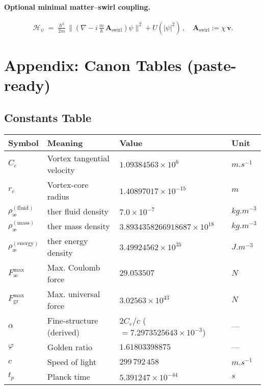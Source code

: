 \documentclass[11pt,a4paper]{article}
\newcommand{\aeether}{\text{\ae}} %
\begin{document}
    \paragraph{Optional minimal matter--swirl coupling.}
    \[
        \boxed{\, \mathcal H_\psi \;=\; \tfrac{\hbar^2}{2m}\,\big\lVert(\nabla - i\,\tfrac{m}{\hbar}\,\bm A_{\mathrm{swirl}})\psi\big\rVert^2 + U(|\psi|^2) \,},\quad \bm A_{\mathrm{swirl}}:=\chi\,\bm v.
    \]

    \section{Appendix: Canon Tables (paste-ready)}
    \subsection{Constants Table}
    \begin{center}
        \begin{tabular}{@{}llll@{}}
            \toprule
            \textbf{Symbol} & \textbf{Meaning} & \textbf{Value} & \textbf{Unit} \\
            \midrule
            $C_e$ & Vortex tangential velocity & $1.09384563\times 10^{6}$ & $\si{m.s^{-1}}$ \\
            $r_c$ & Vortex-core radius & $1.40897017\times 10^{-15}$ & $\si{m}$ \\
            $\rho_{\aeether}^{(\mathrm{fluid})}$  & \aeether{}ther fluid density & $7.0\times 10^{-7}$ & $\si{kg.m^{-3}}$ \\
            $\rho_{\aeether}^{(\mathrm{mass})}$   & \aeether{}ther mass density & $3.8934358266918687\times 10^{18}$ & $\si{kg.m^{-3}}$ \\
            $\rho_{\aeether}^{(\mathrm{energy})}$ & \aeether{}ther energy density & $3.49924562\times 10^{35}$ & $\si{J.m^{-3}}$ \\
            $F_{\aeether}^{\max}$ & Max. Coulomb force & $29.053507$ & $\si{N}$ \\
            $F_{\mathrm{gr}}^{\max}$ & Max. universal force & $3.02563\times 10^{43}$ & $\si{N}$ \\
            $\alpha$ & Fine-structure (derived) & $2C_e/c$ ($=7.2973525643\times 10^{-3}$) & --- \\
            $\varphi$ & Golden ratio & $1.61803398875$ & --- \\
            $c$ & Speed of light & $299\,792\,458$ & $\si{m.s^{-1}}$ \\
            $t_p$ & Planck time & $5.391247\times 10^{-44}$ & $\si{s}$ \\
            \bottomrule
        \end{tabular}
    \end{center}
\end{document}
